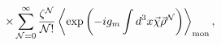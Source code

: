 \begin{equation}
\label{II}
\times\sum\limits_{{\cal N}=0}^{\infty}\frac{\zeta^{\cal N}}{{\cal N}!}
\left<\exp\left(-ig_m\int d^3x\vec\chi\vec\rho^{\cal N}\right)\right>_{\rm mon},
\end{equation}

